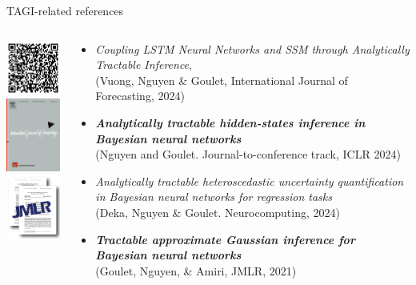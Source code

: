 \documentclass[final]{beamer}
\begin{document}
\begin{frame}[t]
\begin{columns}
\begin{column}[T]{.31\textwidth}
\begin{block}{TAGI-related references}
\begin{columns}
\begin{column}{.15\textwidth}\centering
\includegraphics[width=30mm]{Figures/cuTAGI_refs_QR.pdf}\\[5pt]
\includegraphics[width=20mm]{Figures/IJF.jpg}\\[5pt]
\includegraphics[width=22mm]{Figures/TAGI_AA_JMLR_2.png}
\end{column}\hspace{-20mm}


\begin{column}{.79\textwidth}
\begin{itemize}
\item \emph{Coupling LSTM Neural Networks and SSM through Analytically Tractable Inference},\\(Vuong, Nguyen \& Goulet, International Journal of Forecasting, 2024)
\item \emph{\bf Analytically tractable hidden-states inference in Bayesian neural networks}\\ (Nguyen and Goulet. Journal-to-conference track, ICLR 2024)
\item \emph{Analytically tractable heteroscedastic uncertainty quantification in Bayesian neural networks for regression tasks}\\ (Deka, Nguyen \& Goulet. Neurocomputing, 2024)
\item \emph{\bf Tractable approximate Gaussian inference for Bayesian neural networks}\\ (Goulet, Nguyen, \& Amiri, JMLR, 2021)
\end{itemize}
\end{column}
\end{columns}
\end{block}





\end{column}
\end{columns}
\end{frame}
\end{document}
